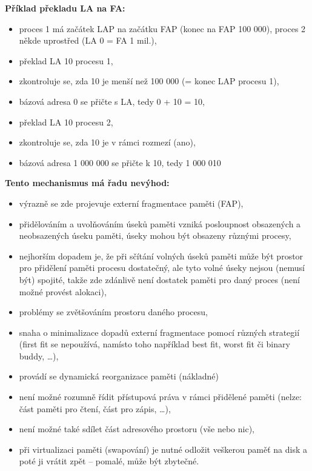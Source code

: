 \documentclass[a4paper, 11pt]{article}
\begin{document}
\textbf{Příklad překladu LA na FA:}
\begin{itemize}
    \item proces 1 má začátek LAP na začátku FAP (konec na FAP 100 000), proces 2 někde uprostřed (LA 0 = FA 1 mil.),
    \item překlad LA 10 procesu 1,
    \item zkontroluje se, zda 10 je menší než 100 000 (= konec LAP procesu 1),
    \item bázová adresa 0 se přičte s LA, tedy 0 + 10 = 10,
    \item překlad LA 10 procesu 2,
    \item zkontroluje se, zda 10 je v rámci rozmezí (ano),
    \item bázová adresa 1 000 000 se přičte k 10, tedy 1 000 010
\end{itemize}
 
\textbf{Tento mechanismus má řadu nevýhod:}
\begin{itemize}
    \item výrazně se zde projevuje externí fragmentace paměti (FAP),
    \item přidělováním a uvolňováním úseků paměti vzniká posloupnost obsazených a neobsazených úseku paměti, úseky mohou být obsazeny různými procesy,
    \item nejhorším dopadem je, že při sčítání volných úseků paměti může být prostor pro přidělení paměti procesu dostatečný, ale tyto volné úseky nejsou (nemusí být) spojité, takže zde zdánlivě není dostatek paměti pro daný proces (není možné provést alokaci),
    \item problémy se zvětšováním prostoru daného procesu,
    \item snaha o minimalizace dopadů externí fragmentace pomocí různých strategií (first fit se nepoužívá, namísto toho například best fit, worst fit či binary buddy, \ldots),
    \item provádí se dynamická reorganizace paměti (nákladné)
    \item není možné rozumně řídit přístupová práva v rámci přidělené paměti (nelze: část paměti pro čtení, část pro zápis, \ldots),
    \item není možné také sdílet část adresového prostoru (vše nebo nic),
    \item při virtualizaci paměti (swapování) je nutné odložit veškerou paměť na disk a poté ji vrátit zpět -- pomalé, může být zbytečné.
\end{itemize}
\end{document}
